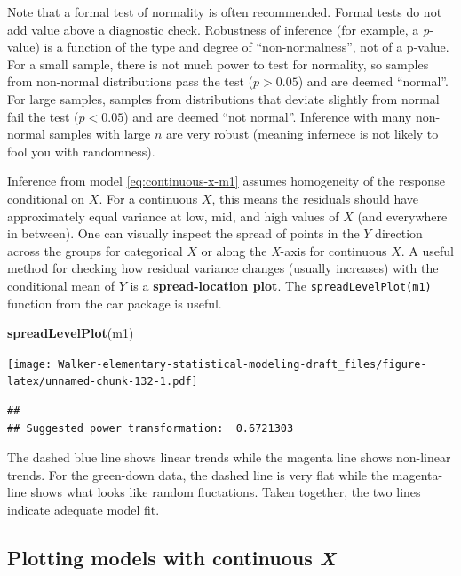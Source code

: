 \documentclass[]{book}
\newenvironment{Shaded}{\begin{snugshade}}{\end{snugshade}}
\newcommand{\KeywordTok}[1]{\textcolor[rgb]{0.13,0.29,0.53}{\textbf{#1}}}
\newcommand{\NormalTok}[1]{#1}
\begin{document}
Note that a formal test of normality is often recommended. Formal tests do not add value above a diagnostic check. Robustness of inference (for example, a \emph{p}-value) is a function of the type and degree of ``non-normalness'', not of a p-value. For a small sample, there is not much power to test for normality, so samples from non-normal distributions pass the test (\(p > 0.05\)) and are deemed ``normal''. For large samples, samples from distributions that deviate slightly from normal fail the test (\(p < 0.05\)) and are deemed ``not normal''. Inference with many non-normal samples with large \(n\) are very robust (meaning infernece is not likely to fool you with randomness).

Inference from model \eqref{eq:continuous-x-m1} assumes homogeneity of the response conditional on \(X\). For a continuous \(X\), this means the residuals should have approximately equal variance at low, mid, and high values of \(X\) (and everywhere in between). One can visually inspect the spread of points in the \(Y\) direction across the groups for categorical \(X\) or along the \emph{X}-axis for continuous \(X\). A useful method for checking how residual variance changes (usually increases) with the conditional mean of \(Y\) is a \textbf{spread-location plot}. The \texttt{spreadLevelPlot(m1)} function from the car package is useful.

\begin{Shaded}
\begin{Highlighting}[]
\KeywordTok{spreadLevelPlot}\NormalTok{(m1)}
\end{Highlighting}
\end{Shaded}

\texttt{[image: Walker-elementary-statistical-modeling-draft\_files/figure-latex/unnamed-chunk-132-1.pdf]}

\begin{verbatim}
## 
## Suggested power transformation:  0.6721303
\end{verbatim}

The dashed blue line shows linear trends while the magenta line shows non-linear trends. For the green-down data, the dashed line is very flat while the magenta-line shows what looks like random fluctations. Taken together, the two lines indicate adequate model fit.

\hypertarget{plotting-models-with-continuous-x}{%
\subsection{\texorpdfstring{Plotting models with continuous \emph{X}}{Plotting models with continuous X}}\label{plotting-models-with-continuous-x}}
\end{document}
